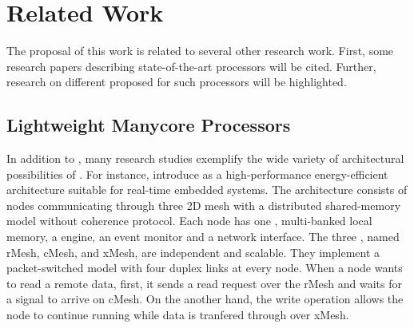 \chapter{Related Work}
\label{ch.related-work}

The proposal of this work is related to several other research work.
First, some research papers describing state-of-the-art \lightweight \manycores
processors will be cited. Further, research on different \oss
proposed for such processors will be highlighted.

\section{Lightweight Manycore Processors}
\label{sec.works.manycores}

	In addition to \mppa, many research studies exemplify the wide variety of
	architectural possibilities of \lightweight \manycores.
	For instance,  introduce \epiphany as a
	high-performance energy-efficient \manycore architecture suitable for
	real-time embedded systems.
	The architecture consists of nodes communicating through three 2D mesh \nocs
	with a distributed shared-memory model without coherence protocol.
	Each node has one \risc \cpu, multi-banked local memory, a \dma engine,
	an event monitor and a network interface.
	The three \nocs, named rMesh, cMesh, and xMesh, are independent and scalable.
	They implement a packet-switched model with four duplex links at every node.
	When a node wants to read a remote data, first, it sends a read request over
	the rMesh and waits for a signal to arrive on cMesh.
	On the another hand, the write operation allows the node to continue running
	while data is tranfered through over xMesh.

